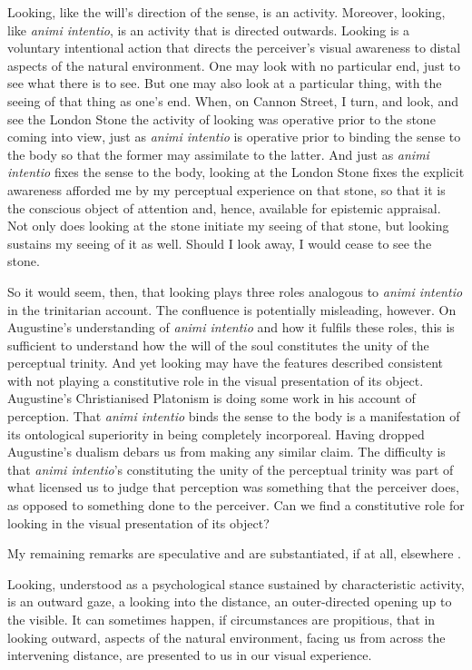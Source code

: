 \documentclass[12pt]{article}
\begin{document}
Looking, like the will's direction of the sense, is an activity. Moreover, looking, like \emph{animi intentio}, is an activity that is directed outwards. Looking is a voluntary intentional action that directs the perceiver's visual awareness to distal aspects of the natural environment. One may look with no particular end, just to see what there is to see. But one may also look at a particular thing, with the seeing of that thing as one's end. When, on Cannon Street, I turn, and look, and see the London Stone the activity of looking was operative prior to the stone coming into view, just as \emph{animi intentio} is operative prior to binding the sense to the body so that the former may assimilate to the latter. And just as \emph{animi intentio} fixes the sense to the body, looking at the London Stone fixes the explicit awareness afforded me by my perceptual experience on that stone, so that it is the conscious object of attention and, hence, available for epistemic appraisal. Not only does looking at the stone initiate my seeing of that stone, but looking sustains my seeing of it as well. Should I look away, I would cease to see the stone.

So it would seem, then, that looking plays three roles analogous to \emph{animi intentio} in the trinitarian account. The confluence is potentially misleading, however. On Augustine's understanding of \emph{animi intentio} and how it fulfils these roles, this is sufficient to understand how the will of the soul constitutes the unity of the perceptual trinity. And yet looking may have the features described consistent with not playing a constitutive role in the visual presentation of its object. Augustine's Christianised Platonism is doing some work in his account of perception. That \emph{animi intentio} binds the sense to the body is a manifestation of its ontological superiority in being completely incorporeal. Having dropped Augustine's dualism debars us from making any similar claim. The difficulty is that \emph{animi intentio}'s constituting the unity of the perceptual trinity was part of what licensed us to judge that perception was something that the perceiver does, as opposed to something done to the perceiver. Can we find a constitutive role for looking in the visual presentation of its object?

My remaining remarks are speculative and are substantiated, if at all, elsewhere \citep{Kalderon:2015aa}.

Looking, understood as a psychological stance sustained by characteristic activity, is an outward gaze, a looking into the distance, an outer-directed opening up to the visible. It can sometimes happen, if circumstances are propitious, that in looking outward, aspects of the natural environment, facing us from across the intervening distance, are presented to us in our visual experience. 
\end{document}
